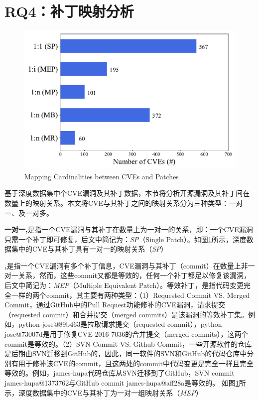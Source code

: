 \section{RQ4：补丁映射分析}\label{sec:cardinality}
\begin{figure}[h]
\centering
\includegraphics[scale=0.5]{res/rq4-cardinality.pdf}
\vspace{-10pt}
\caption{Mapping Cardinalities between CVEs and Patches}\label{fig:rq4-cardinality}
\end{figure}

基于深度数据集中个CVE漏洞及其补丁数据，本节将分析开源漏洞及其补丁间在数量上的映射关系。本文将CVE与其补丁之间的映射关系分为三种类型：一对一、及一对多。

\textbf{一对一,}是指一个CVE漏洞与其补丁在数量上为一对一的关系，即：一个CVE漏洞只需一个补丁即可修复，后文中简记为：\textit{SP}（Single Patch）。如图\ref{fig:rq4-cardinality}所示，深度数据集中的CVE与其补丁具有一对一的映射关系（\textit{SP}）

\textbf{,}是指一个CVE漏洞有多个补丁信息，CVE漏洞与其补丁（commit）在数量上非一对一关系，然而，这些commit又都是等效的，任何一个补丁都足以修复该漏洞，后文中简记为：\textit{MEP}（Multiple Equivalent Patch）。等效补丁，是指代码变更完全一样的两个commit，其主要有两种类型：（1）Requested Commit VS. Merged Commit，通过GitHub中的Pull Request功能修补的CVE漏洞，请求提交（requested commit）和合并提交（merged commits）是该漏洞的等效补丁集。例如，python-jose@89b463\cite{python-jose-1}是拉取请求提交（requested commit），python-jose@73007d\cite{python-jose-2}是用于修复CVE-2016-7036的合并提交（merged commits），这两个commit是等效的。（2）SVN Commit VS. Github Commit，一些开源软件的仓库是后期由SVN迁移到GitHub的，因此，同一软件的SVN和GitHub的代码仓库中分别有用于修补该CVE的commit，且这两处的commit中代码变更是完全一样且完全等效的。例如，james-hupa代码仓库从SVN迁移到了GitHub，SVN commit james-hupa@1373762\cite{james-hupa-1}与GitHub commit james-hupa@aff28a\cite{james-hupa-2}是等效的。
如图\ref{fig:rq4-cardinality}所示，深度数据集中的CVE与其补丁为一对一组映射关系（\textit{MEP}）

